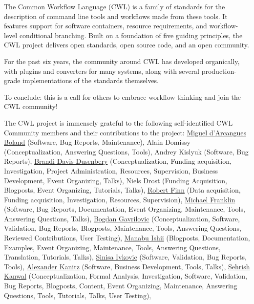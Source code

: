 \documentclass[sigconf,authordraft]{acmart}
\begin{document}
The Common Workflow Language (CWL) is a family of standards for the description of command line tools and workflows made from these tools. It features support for software containers, resource requirements, and workflow-level conditional branching. Built on a foundation of five guiding principles, the CWL project delivers open standards, open source code, and an open community.

For the past six years, the community around CWL has developed organically, with plugins and converters for many systems, along with several production-grade implementations of the standards themselves.

To conclude: this is a call for others to embrace workflow thinking and join the CWL community!

\begin{acks}
The CWL project is immensely grateful to the following self-identified CWL Community members and their contributions to the project:
\href{https://orcid.org/0000-0002-2703-8936}{Miguel d'Arcangues Boland} (Software, Bug Reports, Maintenance),
Alain Domissy (Conceptualization, Answering Questions, Tools),
Andrey Kislyuk (Software, Bug Reports),
\href{https://orcid.org/0000-0001-7811-8613}{Brandi Davis-Dusenbery} (Conceptualization, Funding acquisition, Investigation, Project Administration, Resources, Supervision, Business
Development, Event Organizing, Talks),
\href{https://orcid.org/0000-0001-9795-7981}{Niels Drost} (Funding Acquisition, Blogposts, Event Organizing, Tutorials, Talks),
\href{https://orcid.org/0000-0001-8626-2148}{Robert Finn} (Data acquisition, Funding acquisition, Investigation, Resources, Supervision),
\href{https://orcid.org/0000-0001-9292-1533}{Michael Franklin} (Software, Bug Reports, Documentation, Event Organizing, Maintenance, Tools, Answering Questions, Talks),
\href{https://orcid.org/0000-0003-1550-1716}{Bogdan Gavrilovic} (Conceptualization, Software, Validation, Bug Reports, Blogposts, Maintenance, Tools, Answering Questions, Reviewed Contributions, User Testing),
\href{https://orcid.org/0000-0002-5843-4712}{Manabu Ishii} (Blogposts, Documentation, Examples, Event Organizing, Maintenance, Tools, Answering Questions, Translation, Tutorials, Talks),
\href{https://orcid.org/0000-0003-4115-3313}{Sinisa Ivkovic} (Software, Validation, Bug Reports, Tools),
\href{https://orcid.org/0000-0002-3468-0652}{Alexander Kanitz} (Software, Business Development, Tools, Talks),
\href{https://orcid.org/0000-0002-5044-4692}{Sehrish Kanwal} (Conceptualization, Formal Analysis, Investigation, Software, Validation, Bug Reports, Blogposts, Content, Event Organizing, Maintenance, Answering Questions, Tools, Tutorials, Talks, User Testing),

\end{acks}
\end{document}
